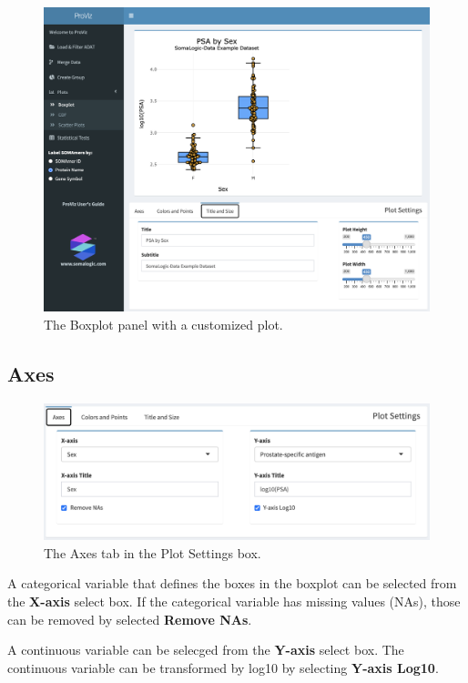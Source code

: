 \documentclass[
]{book}
\begin{document}
\begin{figure}
\centering
\includegraphics{images/BoxPlot_Panel.png}
\caption{The Boxplot panel with a customized plot.}
\end{figure}

\hypertarget{axes}{%
\subsection{Axes}\label{axes}}

\begin{figure}
\centering
\includegraphics{images/Boxplot_Axes.png}
\caption{The Axes tab in the Plot Settings box.}
\end{figure}

A categorical variable that defines the boxes in the boxplot can be selected from the \textbf{X-axis} select box. If the categorical variable has missing values (NAs), those can be removed by selected \textbf{Remove NAs}.

A continuous variable can be selecged from the \textbf{Y-axis} select box. The continuous variable can be transformed by log10 by selecting \textbf{Y-axis Log10}.
\end{document}
